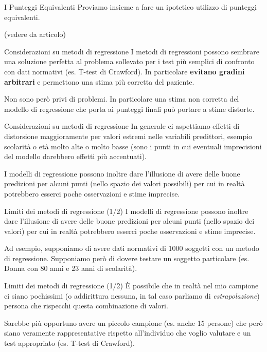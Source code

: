 \documentclass[
  ignorenonframetext,
]{beamer}
\begin{document}
\begin{frame}{I Punteggi Equivalenti}
\label{i-punteggi-equivalenti-12}
Proviamo insieme a fare un ipotetico utilizzo di punteggi equivalenti.

(vedere da articolo)
\end{frame}

\begin{frame}{Considerazioni su metodi di regressione}
\label{considerazioni-su-metodi-di-regressione}
I metodi di regressioni possono sembrare una soluzione perfetta al
problema sollevato per i test più semplici di confronto con dati
normativi (es. T-test di Crawford). In particolare \textbf{evitano
gradini arbitrari} e permettono una stima più corretta del paziente.

Non sono però privi di problemi. In particolare una stima non corretta
del modello di regressione che porta ai punteggi finali può portare a
stime distorte.
\end{frame}

\begin{frame}{Considerazioni su metodi di regressione}
\label{considerazioni-su-metodi-di-regressione-1}
In generale ci aspettiamo effetti di distorsione maggioramente per
valori estremi nelle variabili predittori, esempio scolarità o età molto
alte o molto basse (sono i punti in cui eventuali imprecisioni del
modello darebbero effetti più accentuati).

I modelli di regressione possono inoltre dare l'illusione di avere delle
buone predizioni per alcuni punti (nello spazio dei valori possibili)
per cui in realtà potrebbero esserci poche osservazioni e stime
imprecise.
\end{frame}

\begin{frame}{Limiti dei metodi di regressione (1/2)}
\label{limiti-dei-metodi-di-regressione-12}
I modelli di regressione possono inoltre dare l'illusione di avere delle
buone predizioni per alcuni punti (nello spazio dei valori) per cui in
realtà potrebbero esserci poche osservazioni e stime imprecise.

Ad esempio, supponiamo di avere dati normativi di 1000 soggetti con un
metodo di regressione. Supponiamo però di dovere testare un soggetto
particolare (es. Donna con 80 anni e 23 anni di scolarità).
\end{frame}

\begin{frame}{Limiti dei metodi di regressione (1/2)}
\label{limiti-dei-metodi-di-regressione-12-1}
È possibile che in realtà nel mio campione ci siano pochissimi (o
addirittura nessuna, in tal caso parliamo di \emph{estrapolazione})
persona che rispecchi questa combinazione di valori.

Sarebbe più opportuno avere un piccolo campione (es. anche 15 persone)
che però siano veramente rappresentative rispetto all'individuo che
voglio valutare e un test appropriato (es. T-test di Crawford).
\end{frame}
\end{document}
